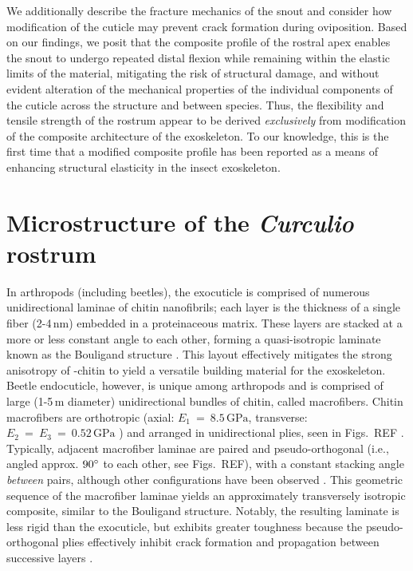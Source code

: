 \documentclass[twocolumn, linenumbers, superscriptaddress, nofootinbib]{revtex4-1}
\begin{document}
{	We additionally describe the fracture mechanics of the snout and consider how modification of the cuticle may prevent crack formation during oviposition.
	Based on our findings, we posit that the composite profile of the rostral apex enables the snout to undergo repeated distal flexion while remaining within the elastic limits of the material, mitigating the risk of structural damage, and without evident alteration of the mechanical properties of the individual components of the cuticle across the structure and between species.
	Thus, the flexibility and tensile strength of the rostrum appear to be derived \emph{exclusively} from modification of the composite architecture of the exoskeleton.
	To our knowledge, this is the first time that a modified composite profile has been reported as a means of enhancing structural elasticity in the insect exoskeleton.
}	
	\section{Microstructure of the \textit{Curculio} rostrum}
		In arthropods (including beetles), the exocuticle is comprised of numerous unidirectional laminae of chitin nanofibrils; each layer is the thickness of a single fiber (2-4\,nm) embedded in a proteinaceous matrix.
		These layers are stacked at a more or less constant angle to each other, forming a quasi-isotropic laminate known as the Bouligand structure \cite{Blackwell1980,Bouligand1972,Neville1976}. 
		This layout effectively mitigates the strong anisotropy of \textalpha-chitin to yield a versatile building material for the exoskeleton.		
		Beetle endocuticle, however, is unique among arthropods and is comprised of large (1-5\,{\textmu}m diameter) unidirectional bundles of chitin, called macrofibers.
		Chitin macrofibers are orthotropic (axial: $E_1~=~8.5\,\text{GPa}$, transverse: $ E_2~=~E_3~=~0.52\,\text{GPa}$ \cite{Jansen2016}) and arranged in unidirectional plies, seen in Figs.~REF \cite{Kamp2010,Kamp2015}.
		Typically, adjacent macrofiber laminae are paired and pseudo-orthogonal (i.e., angled approx. $90\degree$ to each other, see Figs.~REF), with a constant stacking angle \emph{between} pairs, although other configurations have been observed \cite{Hepburn1973,Kamp2010}.
		This geometric sequence of the macrofiber laminae yields an approximately transversely isotropic composite, similar to the Bouligand structure.
		Notably, the resulting laminate is less rigid than the exocuticle, but exhibits greater toughness because the pseudo-orthogonal plies effectively inhibit crack formation and propagation between successive layers \cite{Kamp2010,Kamp2015,Hepburn1973}.
		
\end{document}

